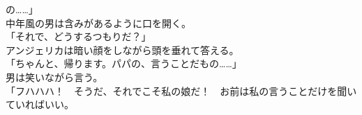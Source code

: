 \documentclass[b5j,10pt,openany]{jsbook}
\begin{document}
の\ldots{}\ldots{}」\\中年風の男は含みがあるように口を開く。\\「それで、どうするつもりだ？」\\アンジェリカは暗い顔をしながら頭を垂れて答える。\\「ちゃんと、帰ります。パパの、言うことだもの\ldots{}\ldots{}」\\男は笑いながら言う。\\「フハハハ！　そうだ、それでこそ私の娘だ！　お前は私の言うことだけを聞いていればいい。
\end{document}
